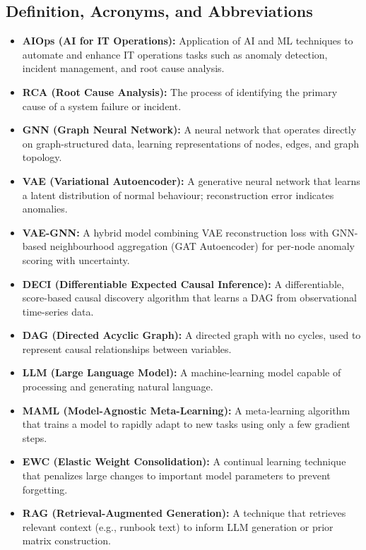 \documentclass[11pt,a4paper]{article}
\begin{document}

\subsection{Definition, Acronyms, and Abbreviations}

\begin{itemize}
    \item \textbf{AIOps (AI for IT Operations):} Application of AI and ML techniques to automate and enhance IT operations tasks such as anomaly detection, incident management, and root cause analysis.
    \item \textbf{RCA (Root Cause Analysis):} The process of identifying the primary cause of a system failure or incident.
    \item \textbf{GNN (Graph Neural Network):} A neural network that operates directly on graph-structured data, learning representations of nodes, edges, and graph topology.
    \item \textbf{VAE (Variational Autoencoder):} A generative neural network that learns a latent distribution of normal behaviour; reconstruction error indicates anomalies.
    \item \textbf{VAE-GNN:} A hybrid model combining VAE reconstruction loss with GNN-based neighbourhood aggregation (GAT Autoencoder) for per-node anomaly scoring with uncertainty.
    \item \textbf{DECI (Differentiable Expected Causal Inference):} A differentiable, score-based causal discovery algorithm that learns a DAG from observational time-series data.
    \item \textbf{DAG (Directed Acyclic Graph):} A directed graph with no cycles, used to represent causal relationships between variables.
    \item \textbf{LLM (Large Language Model):} A machine-learning model capable of processing and generating natural language.
    \item \textbf{MAML (Model-Agnostic Meta-Learning):} A meta-learning algorithm that trains a model to rapidly adapt to new tasks using only a few gradient steps.
    \item \textbf{EWC (Elastic Weight Consolidation):} A continual learning technique that penalizes large changes to important model parameters to prevent forgetting.
    \item \textbf{RAG (Retrieval-Augmented Generation):} A technique that retrieves relevant context (e.g., runbook text) to inform LLM generation or prior matrix construction.

\end{itemize}
\end{document}
